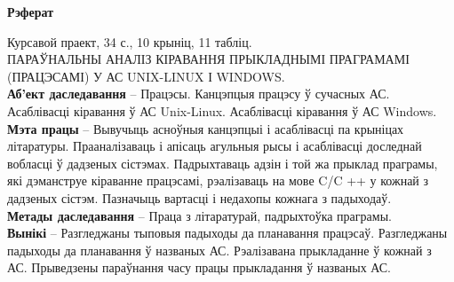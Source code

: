 \begin{center}
\textbf{Рэферат}
\end{center}

Курсавой праект, 34 с., 10 крыніц, 11 табліц.\\

ПАРАЎНАЛЬНЫ АНАЛІЗ КІРАВАННЯ ПРЫКЛАДНЫМІ ПРАГРАМАМІ (ПРАЦЭСАМІ) У АС UNIX-LINUX І WINDOWS.\\

\quad \textbf{Аб'ект даследавання} -- Працэсы. Канцэпцыя працэсу ў сучасных АС. Асаблівасці кіравання ў АС Unix-Linux. Асаблівасці кіравання ў АС Windows.\\

\quad \textbf{Мэта працы} -- Вывучыць асноўныя канцэпцыі і асаблівасці па крыніцах літаратуры. Прааналізаваць і апісаць агульныя рысы і асаблівасці доследнай вобласці ў дадзеных сістэмах. Падрыхтаваць адзін і той жа прыклад праграмы, які дэманструе кіраванне працэсамі, рэалізаваць на мове C/C ++ у кожнай з дадзеных сістэм. Пазначыць вартасці і недахопы кожнага з падыходаў.\\

\quad \textbf{Метады даследавання} -- Праца з літаратурай, падрыхтоўка праграмы.\\

\quad \textbf{Вынікі}  -- Разгледжаны тыповыя падыходы да планавання працэсаў. Разгледжаны падыходы да планавання ў названых АС. Рэалізавана прыкладанне ў кожнай з АС. Прыведзены параўнання часу працы прыкладання ў названых АС.
